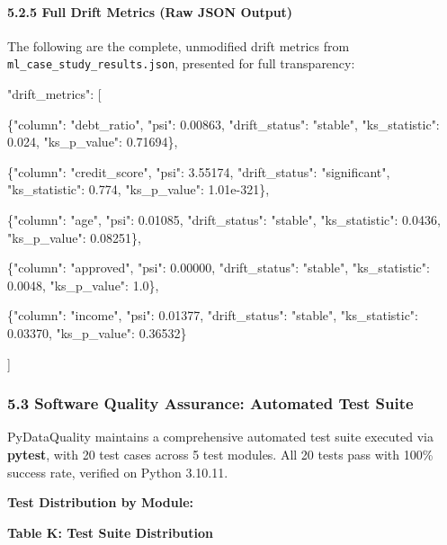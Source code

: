 \documentclass{article}
\begin{document}
\paragraph{5.2.5 Full Drift Metrics (Raw JSON
Output)}\label{full-drift-metrics-raw-json-output}

The following are the complete, unmodified drift metrics from
\texttt{ml\_case\_study\_results.json}, presented for full transparency:

"drift\_metrics": {[}

\{"column": "debt\_ratio", "psi": 0.00863, "drift\_status": "stable",
"ks\_statistic": 0.024, "ks\_p\_value": 0.71694\},

\{"column": "credit\_score", "psi": 3.55174, "drift\_status":
"significant", "ks\_statistic": 0.774, "ks\_p\_value": 1.01e-321\},

\{"column": "age", "psi": 0.01085, "drift\_status": "stable",
"ks\_statistic": 0.0436, "ks\_p\_value": 0.08251\},

\{"column": "approved", "psi": 0.00000, "drift\_status": "stable",
"ks\_statistic": 0.0048, "ks\_p\_value": 1.0\},

\{"column": "income", "psi": 0.01377, "drift\_status": "stable",
"ks\_statistic": 0.03370, "ks\_p\_value": 0.36532\}

{]}

\subsubsection{5.3 Software Quality Assurance: Automated Test
Suite}\label{software-quality-assurance-automated-test-suite}

PyDataQuality maintains a comprehensive automated test suite executed
via \textbf{pytest}, with 20 test cases across 5 test modules. All 20
tests pass with 100\% success rate, verified on Python 3.10.11.

\textbf{Test Distribution by Module:}

\textbf{Table K: Test Suite Distribution}
\end{document}

